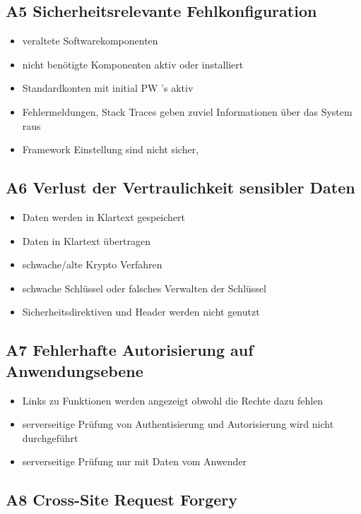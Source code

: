 \subsection*{A5 Sicherheitsrelevante Fehlkonfiguration}

	\begin{itemize}
	\item veraltete Softwarekomponenten
	\item nicht benötigte Komponenten aktiv oder installiert
	\item Standardkonten mit initial PW\'{ '}s aktiv 
	\item Fehlermeldungen, Stack Traces geben zuviel Informationen über das System raus
	\item Framework Einstellung sind nicht sicher,
	\end{itemize}

\subsection*{A6 Verlust der Vertraulichkeit sensibler Daten}

	\begin{itemize}
	\item Daten werden in Klartext gespeichert
	\item Daten in Klartext übertragen
	\item schwache/alte Krypto Verfahren
	\item schwache Schlüssel oder falsches Verwalten der Schlüssel
	\item Sicherheitsdirektiven und Header werden nicht genutzt
	\end{itemize}

\subsection*{A7 Fehlerhafte Autorisierung auf Anwendungsebene}
\begin{itemize}
	\item Links zu Funktionen werden angezeigt obwohl die Rechte dazu fehlen
	\item serverseitige Prüfung von Authentisierung und Autorisierung wird nicht durchgeführt
	\item serverseitige Prüfung nur mit Daten vom Anwender
\end{itemize}

\subsection*{A8 Cross-Site Request Forgery}


